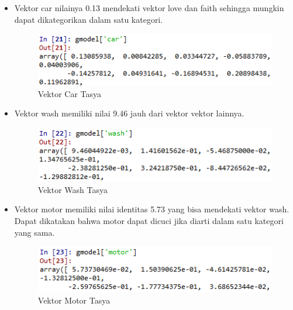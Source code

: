 \begin{itemize}
\item Vektor car nilainya 0.13 mendekati vektor love dan faith sehingga mungkin dapat dikategorikan dalam satu kategori.
\begin{figure}[ht]
\centering
\includegraphics[scale=0.3]{figures/chapter5tasya11.png}
\caption{Vektor Car Tasya}
\label{Praktek}
\end{figure}


\item Vektor wash memiliki nilai 9.46 jauh dari vektor vektor lainnya.
\begin{figure}[ht]
\centering
\includegraphics[scale=0.3]{figures/chapter5tasya12.png}
\caption{Vektor Wash Tasya}
\label{Praktek}
\end{figure}


\item Vektor motor memiliki nilai identitas 5.73 yang bisa mendekati vektor wash. Dapat dikatakan bahwa motor dapat dicuci jika diarti dalam satu kategori yang sama.
\begin{figure}[ht]
\centering
\includegraphics[scale=0.3]{figures/chapter5tasya13.png}
\caption{Vektor Motor Tasya}
\label{Praktek}
\end{figure}
\end{itemize}

